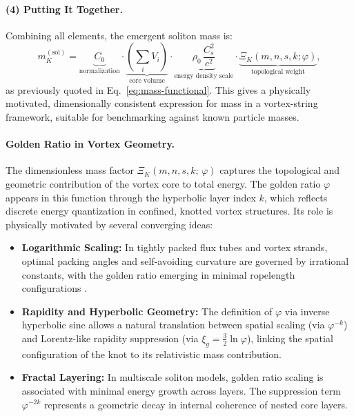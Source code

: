 \documentclass[12pt]{article}
\begin{document}
    \vspace{0.5em}
    \paragraph{(4) Putting It Together.}
    Combining all elements, the emergent soliton mass is:
    \begin{equation}
        m_K^{(\text{sol})} = \underbrace{C_0}_{\text{normalization}} \cdot
        \underbrace{\left( \sum_i V_i \right)}_{\text{core volume}} \cdot
        \underbrace{\rho_0\, \frac{C_s^2}{c^2}}_{\text{energy density scale}} \cdot
        \underbrace{\Xi_K(m,n,s,k;\varphi)}_{\text{topological weight}},
    \end{equation}
    as previously quoted in Eq.~\eqref{eq:mass-functional}. This gives a physically motivated, dimensionally consistent expression for mass in a vortex-string framework, suitable for benchmarking against known particle masses.


    \paragraph{Golden Ratio in Vortex Geometry.}
    The dimensionless mass factor $\Xi_K(m,n,s,k;\,\varphi)$ captures the topological and geometric contribution of the vortex core to total energy. The golden ratio $\varphi$ appears in this function through the hyperbolic layer index $k$, which reflects discrete energy quantization in confined, knotted vortex structures. Its role is physically motivated by several converging ideas:

    \begin{itemize}
        \item \textbf{Logarithmic Scaling:} In tightly packed flux tubes and vortex strands, optimal packing angles and self-avoiding curvature are governed by irrational constants, with the golden ratio emerging in minimal ropelength configurations \cite{Stasiak2009}.
        \item \textbf{Rapidity and Hyperbolic Geometry:} The definition of $\varphi$ via inverse hyperbolic sine allows a natural translation between spatial scaling (via $\varphi^{-k}$) and Lorentz-like rapidity suppression (via $\xi_g = \tfrac{3}{2}\ln\varphi$), linking the spatial configuration of the knot to its relativistic mass contribution.
        \item \textbf{Fractal Layering:} In multiscale soliton models, golden ratio scaling is associated with minimal energy growth across layers. The suppression term $\varphi^{-2k}$ represents a geometric decay in internal coherence of nested core layers.
    \end{itemize}
\end{document}
